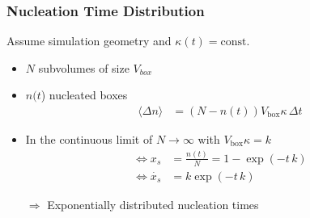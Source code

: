 \documentclass[smaller,notes=hide]{beamer}
\newlength{\wideitemsep}
\let\olditem\item
\renewcommand{\item}{\setlength{\itemsep}{\wideitemsep}\olditem}
\begin{document}
\begin{frame}
\frametitle{Nucleation Time Distribution}
Assume simulation geometry and $\kappa(t) =  \text{const.}$ \vspace{0.25cm}
\begin{itemize}
\item $N$ subvolumes of size $V_{box}$
\item $n(t$) nucleated boxes
\begin{align*}
\langle \Delta n \rangle &= (N - n(t))V_{\text{box}}\kappa \, \Delta t
\end{align*}
\item In the continuous limit of $N \rightarrow \infty $ with $V_{\text{box}}\kappa = k$
\begin{align*}
\Leftrightarrow  x_s &= \frac{n(t)}{N} = 1 - \exp\left( -t \, k\right)\\
\Leftrightarrow \dot{x_s} &= k \exp\left( -t \, k \right)
\end{align*}



$\Rightarrow$ Exponentially distributed nucleation times
\end{itemize}
\end{frame}


\iffalse
\end{document}

